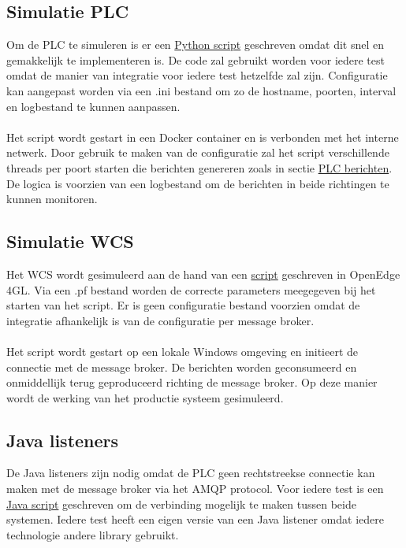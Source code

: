 \subsection{Simulatie PLC}
Om de PLC te simuleren is er een \hyperref[listing:code_plc]{Python script} geschreven omdat dit snel en gemakkelijk te implementeren is.
De code zal gebruikt worden voor iedere test omdat de manier van integratie voor iedere test hetzelfde zal zijn.
Configuratie kan aangepast worden via een .ini bestand om zo de hostname, poorten, interval en logbestand te kunnen aanpassen.
\\\\
Het script wordt gestart in een Docker container en is verbonden met het interne netwerk.
Door gebruik te maken van de configuratie zal het script verschillende threads per poort starten die berichten genereren
zoals in sectie \hyperref[listing:message_example]{PLC berichten}.
De logica is voorzien van een logbestand om de berichten in beide richtingen te kunnen monitoren.

\subsection{Simulatie WCS}
Het WCS wordt gesimuleerd aan de hand van een \hyperref[listing:code_wcs]{script} geschreven in OpenEdge 4GL.
Via een .pf bestand worden de correcte parameters meegegeven bij het starten van het script.
Er is geen configuratie bestand voorzien omdat de integratie afhankelijk is van de configuratie per message broker.
\\\\
Het script wordt gestart op een lokale Windows omgeving en initieert de connectie met de message broker.
De berichten worden geconsumeerd en onmiddellijk terug geproduceerd richting de message broker.
Op deze manier wordt de werking van het productie systeem gesimuleerd.

\subsection{Java listeners}
De Java listeners zijn nodig omdat de PLC geen rechtstreekse connectie kan maken met de message broker via het AMQP protocol.
Voor iedere test is een \hyperref[sec:code_java_listener]{Java script} geschreven om de verbinding mogelijk te maken tussen beide systemen.
Iedere test heeft een eigen versie van een Java listener omdat iedere technologie andere library gebruikt.


